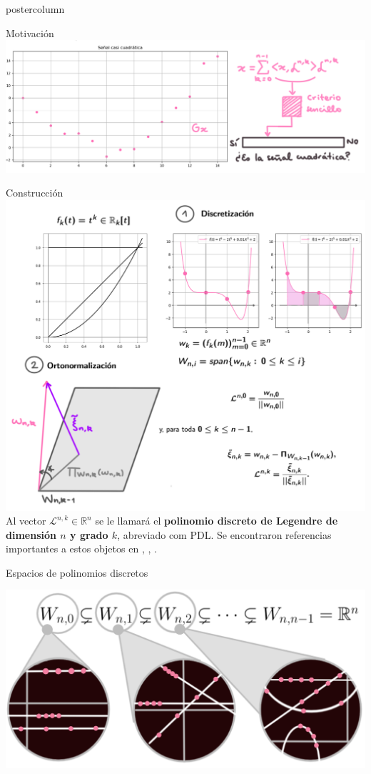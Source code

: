 \documentclass[final,hyperref={pdfpagelabels=false}]{beamer}
\newcommand{\IR}{\mathbb{R}}
\newcommand{\cali}[1]{\mathcal{#1}} %
\begin{document}
\begin{frame}
\begin{columns}
\begin{column}{.49\textwidth}
\begin{beamercolorbox}[center,wd=\textwidth]{postercolumn}
\begin{block}{Motivaci\'on}
            \includegraphics[width=0.95\linewidth]{cuadr2}
            \end{block}
            \vfill
		    \vspace{1cm}            
  
			\begin{block}{Construcci\'on}
			\includegraphics[width=0.95\linewidth]{esquema_construccion_bien}	
			Al vector $\cali{L}^{n,k} \in \IR^{n}$ se le llamar\'a el
			\textbf{polinomio discreto de Legendre de dimensi\'on $n$
			y grado $k$}, abreviado com PDL. Se encontraron referencias
			importantes a estos objetos en \cite{Neuman}, \cite{roy},
			\cite{nikiforov}.
			\end{block}			                        
            \vfill
		    \vspace{1cm}
            
            
			\begin{block}{Espacios de polinomios discretos}
			\begin{center}
			\includegraphics[width=0.7\linewidth]{nuevas_lupas}
			\end{center}
		

\end{block}
\end{beamercolorbox}
\end{column}
\end{columns}
\end{frame}
\end{document}
